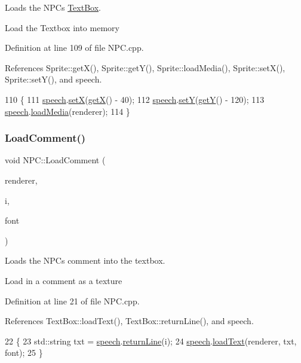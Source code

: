 Loads the N\+P\+Cs \hyperlink{class_text_box}{Text\+Box}. 

Load the Textbox into memory 

Definition at line 109 of file N\+P\+C.\+cpp.



References Sprite\+::get\+X(), Sprite\+::get\+Y(), Sprite\+::load\+Media(), Sprite\+::set\+X(), Sprite\+::set\+Y(), and speech.


\begin{DoxyCode}
110 \{
111     \hyperlink{class_n_p_c_a1a1be15df827227f45559388897a9cd5}{speech}.\hyperlink{class_sprite_ae21322c28b8719af996990fafa920762}{setX}(\hyperlink{class_sprite_a03d6c82bddfd3d164ce8997482c57c85}{getX}() - 40);
112     \hyperlink{class_n_p_c_a1a1be15df827227f45559388897a9cd5}{speech}.\hyperlink{class_sprite_afe7d6d636fc460358c40a403af259d0e}{setY}(\hyperlink{class_sprite_a53ea8b27bcd0dab0627a2dceab2b9d98}{getY}() - 120);
113     \hyperlink{class_n_p_c_a1a1be15df827227f45559388897a9cd5}{speech}.\hyperlink{class_sprite_adab722e01e4d3e197f52ecad6ac8d70a}{loadMedia}(renderer);
114 \}
\end{DoxyCode}
\mbox{\label{class_n_p_c_a468647f008c7e65f2a25be9dcd5e5968}} 
\subsubsection{\texorpdfstring{Load\+Comment()}{LoadComment()}}
{\footnotesize\ttfamily void N\+P\+C\+::\+Load\+Comment (\begin{DoxyParamCaption}\item[{S\+D\+L\+\_\+\+Renderer $\ast$}]{renderer,  }\item[{int}]{i,  }\item[{T\+T\+F\+\_\+\+Font $\ast$}]{font }\end{DoxyParamCaption})}



Loads the N\+P\+Cs comment into the textbox. 

Load in a comment as a texture 

Definition at line 21 of file N\+P\+C.\+cpp.



References Text\+Box\+::load\+Text(), Text\+Box\+::return\+Line(), and speech.


\begin{DoxyCode}
22 \{
23     std::string txt = \hyperlink{class_n_p_c_a1a1be15df827227f45559388897a9cd5}{speech}.\hyperlink{class_text_box_ac10a24236f968ae36705f8bf300dfd79}{returnLine}(i);
24     \hyperlink{class_n_p_c_a1a1be15df827227f45559388897a9cd5}{speech}.\hyperlink{class_text_box_add2f877e6715744908d5eb0c9c53e5a9}{loadText}(renderer, txt, font);
25 \}
\end{DoxyCode}
\mbox{\label{class_n_p_c_abaa15a4fd5a37a62983d7fd2acafe271}} 
